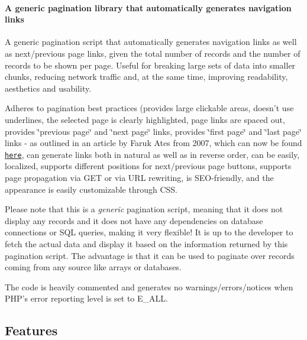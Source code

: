 \paragraph*{A generic pagination library that automatically generates navigation links}

A generic pagination script that automatically generates navigation links as well as next/previous page links, given the total number of records and the number of records to be shown per page. Useful for breaking large sets of data into smaller chunks, reducing network traffic and, at the same time, improving readability, aesthetics and usability.

Adheres to pagination best practices (provides large clickable areas, doesn't use underlines, the selected page is clearly highlighted, page links are spaced out, provides \char`\"{}previous page\char`\"{} and \char`\"{}next page\char`\"{} links, provides \char`\"{}first page\char`\"{} and \char`\"{}last page\char`\"{} links -\/ as outlined in an article by Faruk Ates from 2007, which can now be found \href{https://gist.github.com/622561}{\tt here}, can generate links both in natural as well as in reverse order, can be easily, localized, supports different positions for next/previous page buttons, supports page propagation via G\-E\-T or via U\-R\-L rewriting, is S\-E\-O-\/friendly, and the appearance is easily customizable through C\-S\-S.

Please note that this is a {\itshape generic} pagination script, meaning that it does not display any records and it does not have any dependencies on database connections or S\-Q\-L queries, making it very flexible! It is up to the developer to fetch the actual data and display it based on the information returned by this pagination script. The advantage is that it can be used to paginate over records coming from any source like arrays or databases.

The code is heavily commented and generates no warnings/errors/notices when P\-H\-P's error reporting level is set to E\-\_\-\-A\-L\-L.

\subsection*{Features}


